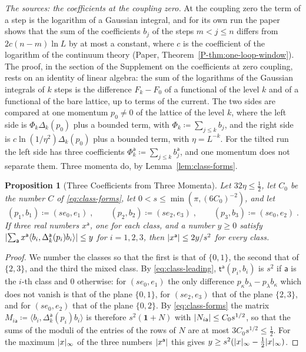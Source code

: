 \documentclass[11pt]{preprint}
\newcommand{\id}{\mathbf 1}
\DeclarePairedDelimiter{\abs}{\lvert}{\rvert}
\numberwithin{equation}{section}
\newtheorem{proposition}[theorem]{Proposition}
\theoremstyle{definition}
\theoremstyle{remark}
\theoremstyle{plain}
\begin{document}
\emph{The sources: the coefficients at the coupling zero.} At the coupling zero the term of a step is the logarithm of a Gaussian integral, and for its own run the paper shows that the sum of the coefficients $b_j$ of the steps $m < j \leq n$ differs from $2c(n - m)\ln L$ by at most a constant, where $c$ is the coefficient of the logarithm of the continuum theory (Paper, Theorem~\ref{P-thm:one-loop-window}). The proof, in the section of the Supplement on the coefficients at zero coupling, rests on an identity of linear algebra: the sum of the logarithms of the Gaussian integrals of $k$ steps is the difference $F_k - F_0$ of a functional of the level $k$ and of a functional of the bare lattice, up to terms of the current. The two sides are compared at one momentum $p_0 \neq 0$ of the lattice of the level $k$, where the left side is $\Phi_k\Delta_k(p_0)$ plus a bounded term, with $\Phi_k \coloneqq \sum_{j \leq k}b_j$, and the right side is $c\ln(1/\eta^2)\Delta_k(p_0)$ plus a bounded term, with $\eta = L^{-k}$. For the tilted run the left side has three coefficients $\Phi^{\mathsf a}_k \coloneqq \sum_{j \leq k}b^{\mathsf a}_j$, and one momentum does not separate them. Three momenta do, by Lemma~\ref{lem:class-forms}.

\begin{proposition}[Three Coefficients from Three Momenta]\label{prop:three-momenta}
Let $32\eta \leq \frac12$, let $C_0$ be the number $C$ of \eqref{eq:class-forms}, let $0 < s \leq \min(\pi, (6C_0)^{-2})$, and let
\begin{equation}\label{eq:three-momenta}
    (p_1, b_1) \coloneqq (se_0, e_1)\;,
    \qquad
    (p_2, b_2) \coloneqq (se_2, e_3)\;,
    \qquad
    (p_3, b_3) \coloneqq (se_0, e_2)\;.
\end{equation}
If three real numbers $x^{\mathsf a}$, one for each class, and a number $y \geq 0$ satisfy $\abs{\sum_{\mathsf a}x^{\mathsf a}\langle b_i, \Delta^{\mathsf a}_k(p_i)b_i\rangle} \leq y$ for $i = 1, 2, 3$, then $\abs{x^{\mathsf a}} \leq 2y/s^2$ for every class.
\end{proposition}

\begin{proof}
We number the classes so that the first is that of $\{ 0, 1 \}$, the second that of $\{ 2, 3 \}$, and the third the mixed class. By \eqref{eq:class-leading}, $\mathsf t^{\mathsf a}(p_i, b_i)$ is $s^2$ if $\mathsf a$ is the $i$-th class and $0$ otherwise: for $(se_0, e_1)$ the only difference $p_\kappa b_\lambda - p_\lambda b_\kappa$ which does not vanish is that of the plane $\{ 0, 1 \}$, for $(se_2, e_3)$ that of the plane $\{ 2, 3 \}$, and for $(se_0, e_2)$ that of the plane $\{ 0, 2 \}$. By \eqref{eq:class-forms} the matrix $M_{i\mathsf a} \coloneqq \langle b_i, \Delta^{\mathsf a}_k(p_i)b_i\rangle$ is therefore $s^2(\id + N)$ with $\abs{N_{i\mathsf a}} \leq C_0s^{1/2}$, so that the sums of the moduli of the entries of the rows of $N$ are at most $3C_0s^{1/2} \leq \frac12$. For the maximum $\abs x_\infty$ of the three numbers $\abs{x^{\mathsf a}}$ this gives $y \geq s^2(\abs x_\infty - \frac12\abs x_\infty)$.
\end{proof}
\end{document}
